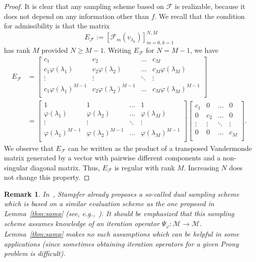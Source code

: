 \documentclass{arxiv}
\newcommand{\cM}{\mathcal{M}}
\newtheorem{remarks}{Remark}[section]
\begin{document}
\begin{proof}
    It is clear that any sampling scheme based on $\mathcal{F}$ is realizable, because it does not depend on any information other than $f$. We recall that the condition for admissibility is that the matrix
    $$
        E_\mathcal{F} := [\mathcal{F}_m(v_{\lambda_k})]_{m=0, k=1}^{N, M} 
    $$
    has rank $M$ provided $N \geq M-1$. Writing $E_{\mathcal{F}}$ for $N = M-1$, we have
    \begin{align*}
        E_{\mathcal{F}} &= \begin{bmatrix}
        c_1 & c_2 & \ldots & c_M \\
         c_1  \varphi(\lambda_1) & c_2   \varphi(\lambda_2) & \ldots & c_M   \varphi(\lambda_M) \\
        \vdots & \vdots & \ddots & \vdots \\
        c_1   \varphi(\lambda_1)^{M-1}  & c_2  \varphi(\lambda_2)^{M-1} & \ldots & c_M   \varphi(\lambda_M)^{M-1} \\
        \end{bmatrix} \\ &=
        \begin{bmatrix}
        1 & 1 & \ldots & 1 \\
         \varphi(\lambda_1)  &  \varphi(\lambda_2) & \ldots &  \varphi(\lambda_M) \\
        \vdots & \vdots & \ddots & \vdots \\
         \varphi(\lambda_1)^{M-1}  &  \varphi(\lambda_2)^{M-1} & \ldots &  \varphi(\lambda_M)^{M-1} \\
        \end{bmatrix}
        \begin{bmatrix}
        c_1 & 0 & \ldots & 0 \\
        0  & c_2 & \ldots & 0 \\
        \vdots & \vdots & \ddots & \vdots \\
        0  & 0 & \ldots & c_M \\
        \end{bmatrix}.
    \end{align*}
    We observe that  $E_{\mathcal{F}}$ can be written as the product of a transposed Vandermonde matrix generated by a vector with pairwise different components and a non-singular diagonal matrix. Thus, $E_{\mathcal{F}}$ is regular with rank $M$. Increasing $N$ does not change this property.
\end{proof}

\begin{remarks}
    In~\cite{stampfer2019generalized}, Stampfer already proposes a so-called dual sampling scheme which is based on a similar evaluation scheme as the one proposed in Lemma~\ref{thm:samp} (see, e.g.,~\cite[Sect.~4.1]{stampfer2019generalized}). It should be emphasized that this sampling scheme assumes knowledge of an iteration operator $\Psi_{\varphi} : \cM \to \cM$. Lemma~\ref{thm:samp} makes no such assumptions which can be helpful in some applications (since sometimes obtaining iteration operators for a given Prony problem is difficult).
\end{remarks}
\end{document}
